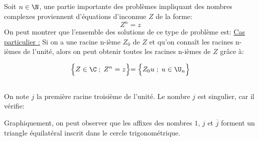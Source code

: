 \subsection*{}
Soit \(n \in \N\), une partie importante des problèmes impliquant des nombres complexes proviennent d'équations d'inconnue \(Z\) de la forme:
\[
   Z^n = z
\]
On peut montrer que l'ensemble des solutions de ce type de problème est:
\underline{Cas particulier {:}}
Si on a une racine n-ième \(Z_0\) de \(Z\) et qu'on connaît les racines n-ièmes de l'unité, alors on peut obtenir toutes les racines n-ièmes de \(Z\) grâce à:

\[
   \Bigl\{ Z \in \C \; ; \; Z^n = z \Bigl\} = \Bigl\{ Z_0u \; ; \; u \in \U_n \Bigl\}   
\]

\subsection*{}
On note \(j\) la première racine troisième de l'unité.
Le nombre \(j\) est singulier, car il vérifie:

Graphiquement, on peut observer que les affixes des nombres \(1\), \(j\) et \(\overline{j}\) forment un triangle équilatéral inscrit dans le cercle trigonométrique.
